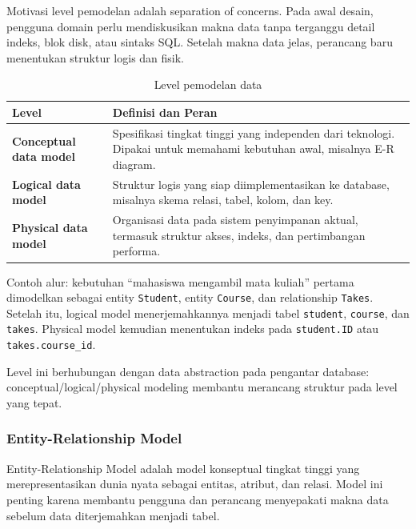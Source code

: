 Motivasi level pemodelan adalah separation of concerns. Pada awal desain, pengguna domain perlu mendiskusikan makna data tanpa terganggu detail indeks, blok disk, atau sintaks SQL. Setelah makna data jelas, perancang baru menentukan struktur logis dan fisik.

\begin{table}[H]
\centering
\begin{tabularx}{\textwidth}{|L{0.24\textwidth}|X|}
\hline
\textbf{Level} & \textbf{Definisi dan Peran} \\
\hline
\textbf{Conceptual data model} & Spesifikasi tingkat tinggi yang independen dari teknologi. Dipakai untuk memahami kebutuhan awal, misalnya E-R diagram. \\
\hline
\textbf{Logical data model} & Struktur logis yang siap diimplementasikan ke database, misalnya skema relasi, tabel, kolom, dan key. \\
\hline
\textbf{Physical data model} & Organisasi data pada sistem penyimpanan aktual, termasuk struktur akses, indeks, dan pertimbangan performa. \\
\hline
\end{tabularx}
\caption{Level pemodelan data}
\label{tab:data-modeling-levels}
\end{table}

Contoh alur: kebutuhan ``mahasiswa mengambil mata kuliah'' pertama dimodelkan sebagai entity \texttt{Student}, entity \texttt{Course}, dan relationship \texttt{Takes}. Setelah itu, logical model menerjemahkannya menjadi tabel \texttt{student}, \texttt{course}, dan \texttt{takes}. Physical model kemudian menentukan indeks pada \texttt{student.ID} atau \texttt{takes.course\_id}.

Level ini berhubungan dengan data abstraction pada pengantar database: conceptual/logical/physical modeling membantu merancang struktur pada level yang tepat.

\subsubsection{Entity-Relationship Model}

\begin{jawab}
Entity-Relationship Model adalah model konseptual tingkat tinggi yang merepresentasikan dunia nyata sebagai entitas, atribut, dan relasi. Model ini penting karena membantu pengguna dan perancang menyepakati makna data sebelum data diterjemahkan menjadi tabel.
\end{jawab}


